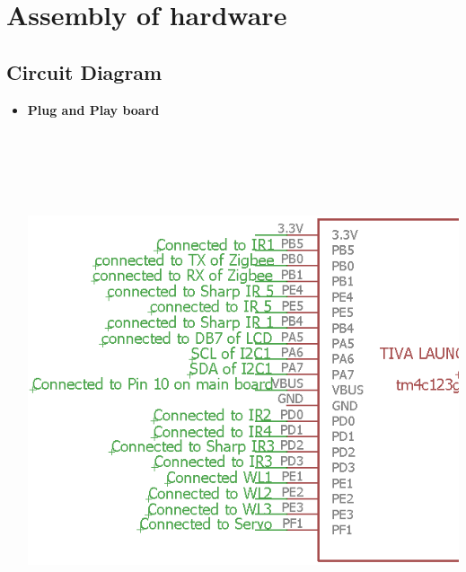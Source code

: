 \documentclass[a4paper,12pt,oneside]{book}
\begin{document}
\section{Assembly of hardware}

\subsection*{Circuit Diagram}
	\begin{itemize}
		\item \textbf{Plug and Play board} \\
			\includegraphics[width=15cm, height=16cm]{Images/PlugandPlay1}
			

\end{itemize}
\end{document}
